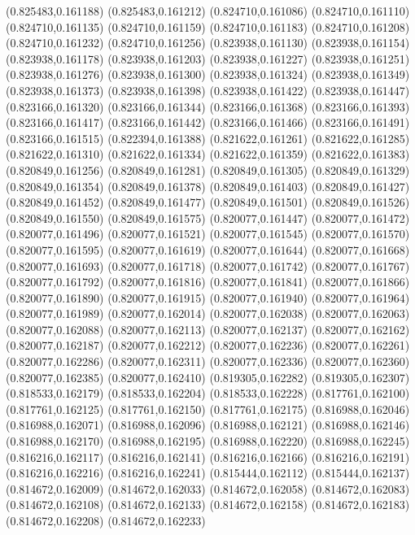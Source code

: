 (0.825483,0.161188)
(0.825483,0.161212)
(0.824710,0.161086)
(0.824710,0.161110)
(0.824710,0.161135)
(0.824710,0.161159)
(0.824710,0.161183)
(0.824710,0.161208)
(0.824710,0.161232)
(0.824710,0.161256)
(0.823938,0.161130)
(0.823938,0.161154)
(0.823938,0.161178)
(0.823938,0.161203)
(0.823938,0.161227)
(0.823938,0.161251)
(0.823938,0.161276)
(0.823938,0.161300)
(0.823938,0.161324)
(0.823938,0.161349)
(0.823938,0.161373)
(0.823938,0.161398)
(0.823938,0.161422)
(0.823938,0.161447)
(0.823166,0.161320)
(0.823166,0.161344)
(0.823166,0.161368)
(0.823166,0.161393)
(0.823166,0.161417)
(0.823166,0.161442)
(0.823166,0.161466)
(0.823166,0.161491)
(0.823166,0.161515)
(0.822394,0.161388)
(0.821622,0.161261)
(0.821622,0.161285)
(0.821622,0.161310)
(0.821622,0.161334)
(0.821622,0.161359)
(0.821622,0.161383)
(0.820849,0.161256)
(0.820849,0.161281)
(0.820849,0.161305)
(0.820849,0.161329)
(0.820849,0.161354)
(0.820849,0.161378)
(0.820849,0.161403)
(0.820849,0.161427)
(0.820849,0.161452)
(0.820849,0.161477)
(0.820849,0.161501)
(0.820849,0.161526)
(0.820849,0.161550)
(0.820849,0.161575)
(0.820077,0.161447)
(0.820077,0.161472)
(0.820077,0.161496)
(0.820077,0.161521)
(0.820077,0.161545)
(0.820077,0.161570)
(0.820077,0.161595)
(0.820077,0.161619)
(0.820077,0.161644)
(0.820077,0.161668)
(0.820077,0.161693)
(0.820077,0.161718)
(0.820077,0.161742)
(0.820077,0.161767)
(0.820077,0.161792)
(0.820077,0.161816)
(0.820077,0.161841)
(0.820077,0.161866)
(0.820077,0.161890)
(0.820077,0.161915)
(0.820077,0.161940)
(0.820077,0.161964)
(0.820077,0.161989)
(0.820077,0.162014)
(0.820077,0.162038)
(0.820077,0.162063)
(0.820077,0.162088)
(0.820077,0.162113)
(0.820077,0.162137)
(0.820077,0.162162)
(0.820077,0.162187)
(0.820077,0.162212)
(0.820077,0.162236)
(0.820077,0.162261)
(0.820077,0.162286)
(0.820077,0.162311)
(0.820077,0.162336)
(0.820077,0.162360)
(0.820077,0.162385)
(0.820077,0.162410)
(0.819305,0.162282)
(0.819305,0.162307)
(0.818533,0.162179)
(0.818533,0.162204)
(0.818533,0.162228)
(0.817761,0.162100)
(0.817761,0.162125)
(0.817761,0.162150)
(0.817761,0.162175)
(0.816988,0.162046)
(0.816988,0.162071)
(0.816988,0.162096)
(0.816988,0.162121)
(0.816988,0.162146)
(0.816988,0.162170)
(0.816988,0.162195)
(0.816988,0.162220)
(0.816988,0.162245)
(0.816216,0.162117)
(0.816216,0.162141)
(0.816216,0.162166)
(0.816216,0.162191)
(0.816216,0.162216)
(0.816216,0.162241)
(0.815444,0.162112)
(0.815444,0.162137)
(0.814672,0.162009)
(0.814672,0.162033)
(0.814672,0.162058)
(0.814672,0.162083)
(0.814672,0.162108)
(0.814672,0.162133)
(0.814672,0.162158)
(0.814672,0.162183)
(0.814672,0.162208)
(0.814672,0.162233)

